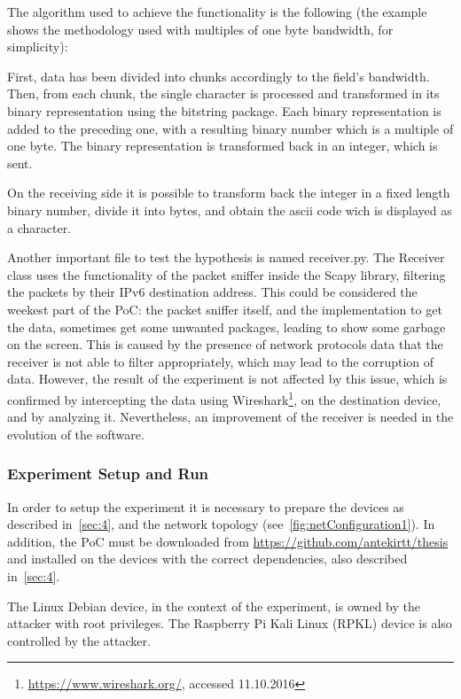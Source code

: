 \documentclass[12pt]{article}
\begin{document}
The algorithm used to achieve the functionality is the following (the example shows the methodology used with multiples of one byte bandwidth, for simplicity):

First, data has been divided into chunks accordingly to the field's bandwidth. Then, from each chunk, the single character is processed and transformed in its binary representation using the bitstring package. Each binary representation is added to the preceding one, with a resulting binary number which is a multiple of one byte. The binary representation is transformed back in an integer, which is sent.

On the receiving side it is possible to transform back the integer in a fixed length binary number, divide it into bytes, and obtain the ascii code wich is displayed as a character.

Another important file to test the hypothesis is named receiver.py. The Receiver class uses the functionality of the packet sniffer inside the Scapy library, filtering the packets by their IPv6 destination address. This could be considered the weekest part of the PoC: the packet sniffer itself, and the implementation to get the data, sometimes get some unwanted packages, leading to show some garbage on the screen. This is caused by the presence of network protocols data that the receiver is not able to filter appropriately, which may lead to the corruption of data. However, the result of the experiment is not affected by this issue, which is confirmed by intercepting the data using Wireshark\footnote{\url{https://www.wireshark.org/}, accessed 11.10.2016}, on the destination device, and by analyzing it. Nevertheless, an improvement of the receiver is needed in the evolution of the software.


\subsubsection{Experiment Setup and Run}
\label{subsub:expRun}

In order to setup the experiment it is necessary to prepare the devices as described in~\ref{sec:4}, and the network topology (see~\ref{fig:netConfiguration1}). In addition, the PoC must be downloaded from \url{https://github.com/antekirtt/thesis} and installed on the devices with the correct dependencies, also described in~\ref{sec:4}.

The Linux Debian device, in the context of the experiment, is owned by the attacker with root privileges. The Raspberry Pi Kali Linux (RPKL) device is also controlled by the attacker.
\end{document}

